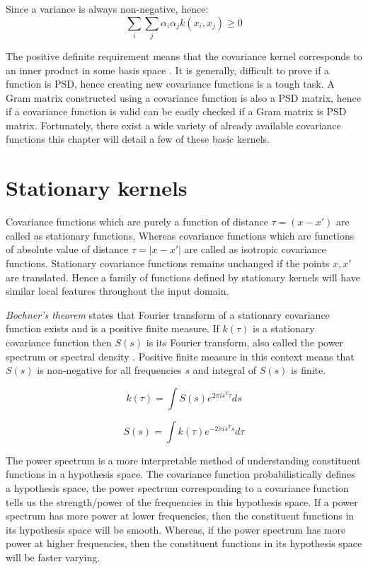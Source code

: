 Since a variance is always non-negative, hence:
\begin{equation}\label{eqPSDCovariance}
\sum_{i}\sum_{j}\alpha_{i}\alpha_{j}k(x_{i}, x_{j}) \geq 0
\end{equation}

The positive definite requirement means that the covariance kernel corresponds to an inner product in some basis space \cite{bishop2006pattern}. It is generally, difficult to prove if a function is PSD, hence creating new covariance functions is a tough task. A Gram matrix constructed using a covariance function is also a PSD matrix, hence if a covariance function is valid can be easily checked if a Gram matrix is PSD matrix. Fortunately, there exist a wide variety of already available covariance functions this chapter will detail a few of these basic kernels. 

\section{Stationary kernels} \label{secStationaryKernels}
Covariance functions which are purely a function of distance \(\tau = (x-x')\) are called as stationary functions, Whereas covariance functions which are functions of absolute value of distance \(\tau = |x-x'|\) are called as isotropic covariance functions. Stationary covariance functions remains unchanged if the points \(x, x'\) are translated. Hence a family of functions defined by stationary kernels will have similar local features throughout the input domain. 

\textit{Bochner's theorem} states that Fourier transform of a stationary covariance function exists and is a positive finite measure. If \(k(\tau)\) is a stationary covariance function then \(S(s)\) is its Fourier transform, also called the power spectrum or spectral density \cite{bochner1959lectures, Stein1999Springer, cox1977theory}. Positive finite measure in this context means that \(S(s)\) is non-negative for all frequencies \(s\) and integral of \(S(s)\) is finite.

\begin{equation}
    k(\tau) = \int S(s) e^{2 \pi is^{T} \tau}ds
\end{equation}

\begin{equation}
    S(s) = \int k(\tau) e^{-2 \pi is^{T} s}d\tau 
\end{equation}

The power spectrum is a more interpretable method of understanding constituent functions in a hypothesis space. The covariance function probabilistically defines a hypothesis space, the power spectrum corresponding to a covariance function tells us the strength/power of the frequencies in this hypothesis space. If a power spectrum has more power at lower frequencies, then the constituent functions in its hypothesis space will be smooth. Whereas, if the power spectrum has more power at higher frequencies, then the constituent functions in its hypothesis space will be faster varying. 

